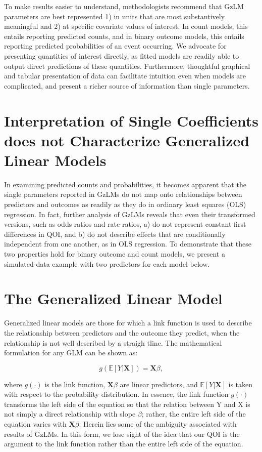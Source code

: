 \documentclass[jou, apacite]{apa6}
\begin{document}
To make results easier to understand, methodologists recommend that GzLM parameters are best represented 1) in units that are most substantively meaningful and 2) at specific covariate values of interest.
In count models, this entails reporting predicted counts, and in binary outcome models, this entails reporting predicted probabilities of an event occurring. 
We advocate for presenting quantities of interest directly, as fitted models are readily able to output direct predictions of these quantities. 
Furthermore, thoughtful graphical and tabular presentation of data can facilitate intuition even when models are complicated, and present a richer source of information than single parameters. 

\section{Interpretation of Single Coefficients does not Characterize Generalized Linear Models}
In examining predicted counts and probabilities, it becomes apparent that the single parameters reported in GzLMs do not map onto relationships between predictors and outcomes as readily as they do in ordinary least squares (OLS) regression. 
In fact, further analysis of GzLMs reveals that even their transformed versions, such as odds ratios and rate ratios, a) do not represent constant first differences in QOI, and b) do not describe effects that are conditionally independent from one another, as in OLS regression. 
To demonstrate that these two properties hold for binary outcome and count models, we present a simulated-data example with two predictors for each model below. 


\section{The Generalized Linear Model}
Generalized linear models are those for which a link function is used to describe the relationship between predictors and the outcome they predict, when the relationship is not well described by a straigh tline. 
The mathematical formulation for any GLM can be shown as:

\begin{equation}
g(\mathbb{E}[Y|\bm{X}]) = \bm{X} \beta ,
\end{equation}

where $g(\cdot)$ is the link function, $\bm{X}\beta$ are linear predictors, and $\mathbb{E}[Y|\bm{X}]$ is taken with respect to the probability distribution. In essence, the link function $g(\cdot)$ transforms the left side of the equation so that the relation between Y and X is not simply a direct relationship with slope $\beta$; rather, the entire left side of the equation varies with $\bm{X}\beta$.
Herein lies some of the ambiguity associated with results of GzLMs.
In this form, we lose sight of the idea that our QOI is the argument to the link function rather than the entire left side of the equation.
\end{document}
